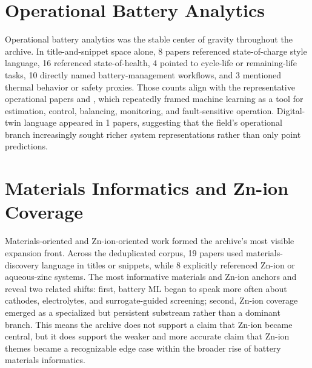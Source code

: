 \documentclass[journal]{IEEEtran}
\begin{document}
\section{Operational Battery Analytics}
Operational battery analytics was the stable center of gravity throughout the archive. In title-and-snippet space alone, 8 papers referenced state-of-charge style language, 16 referenced state-of-health, 4 pointed to cycle-life or remaining-life tasks, 10 directly named battery-management workflows, and 3 mentioned thermal behavior or safety proxies. Those counts align with the representative operational papers \cite{stateestimationof2023,onlineconditionmonitorin2022,socestimationof2023,participationofbattery2020} and \cite{stateestimationof2023,onlineconditionmonitorin2022,socestimationof2023,participationofbattery2020}, which repeatedly framed machine learning as a tool for estimation, control, balancing, monitoring, and fault-sensitive operation. Digital-twin language appeared in 1 papers, suggesting that the field's operational branch increasingly sought richer system representations rather than only point predictions.

\section{Materials Informatics and Zn-ion Coverage}
Materials-oriented and Zn-ion-oriented work formed the archive's most visible expansion front. Across the deduplicated corpus, 19 papers used materials-discovery language in titles or snippets, while 8 explicitly referenced Zn-ion or aqueous-zinc systems. The most informative materials and Zn-ion anchors \cite{textminingfor2022,recentadvancesin2025,interpretablemachinelear2025,datadrivenapproaches2024} and \cite{recentadvancesin2025,predictivedesignof2024,electrolytesforaqueous2025} reveal two related shifts: first, battery ML began to speak more often about cathodes, electrolytes, and surrogate-guided screening; second, Zn-ion coverage emerged as a specialized but persistent substream rather than a dominant branch. This means the archive does not support a claim that Zn-ion became central, but it does support the weaker and more accurate claim that Zn-ion themes became a recognizable edge case within the broader rise of battery materials informatics.
\end{document}
